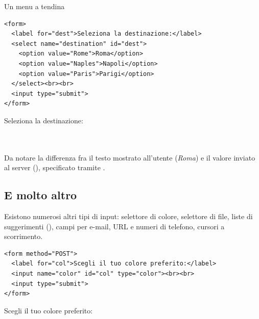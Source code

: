 \begin{esempio}{Un menu a tendina}
\begin{affianco}[0.55]
\begin{lstlisting}[style=html, name=select.html]
<form>
  <label for="dest">Seleziona la destinazione:</label>
  <select name="destination" id="dest">
    <option value="Rome">Roma</option>
    <option value="Naples">Napoli</option>
    <option value="Paris">Parigi</option>
  </select><br><br>
  <input type="submit">
</form>
\end{lstlisting}

\risultato
\begin{browser}
  Seleziona la destinazione:\\[2pt]
  \\[-3.2pt]
  {\setlength{\fboxsep}{0.6pt}}\\[5pt]
\end{browser}
\end{affianco}

Da notare la differenza fra il testo mostrato all'utente (\textit{Roma}) e il
valore inviato al server (), specificato tramite .
\end{esempio}

\subsection{E molto altro}

Esistono numerosi altri tipi di input: selettore di colore, selettore di file,
liste di suggerimenti (), campi per e-mail, URL e numeri di
telefono, cursori a scorrimento.

\begin{affianco}[0.55]
\begin{lstlisting}[style=html, name=colore.html]
<form method="POST">
  <label for="col">Scegli il tuo colore preferito:</label>
  <input name="color" id="col" type="color"><br><br>
  <input type="submit">
</form>
\end{lstlisting}
\risultato
\begin{browser}
  Scegli il tuo colore preferito:
  \\[8pt]
\end{browser}
\end{affianco}

